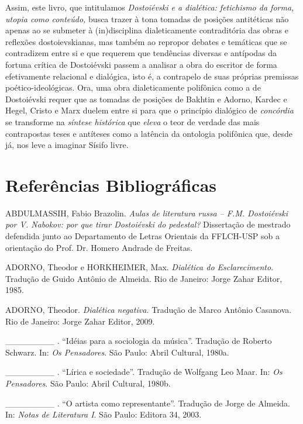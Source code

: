 Assim, este livro, que intitulamos \emph{Dostoiévski e a dialética:
fetichismo da forma, utopia como conteúdo,} busca trazer à tona tomadas
de posições antitéticas não apenas ao se submeter à (in)disciplina
dialeticamente contraditória das obras e reflexões dostoievskianas, mas
também ao repropor debates e temáticas que se contradizem entre si e que
requerem que tendências diversas e antípodas da fortuna crítica de
Dostoiévski passem a analisar a obra do escritor de forma efetivamente
relacional e dialógica, isto é, a contrapelo de suas próprias premissas
poético-ideológicas. Ora, uma obra dialeticamente polifônica como a de
Dostoiévski requer que as tomadas de posições de Bakhtin e Adorno,
Kardec e Hegel, Cristo e Marx duelem entre si para que o princípio
dialógico de \emph{concórdia} se transforme na \emph{síntese histórica}
que \emph{eleva} o teor de verdade das mais contrapostas teses e
antíteses como a latência da ontologia polifônica que, desde já, nos
leve a imaginar Sísifo livre.

\chapter*{Referências Bibliográficas}


ABDULMASSIH, Fabio Brazolin. \emph{Aulas de literatura russa -- F.M.
Dostoiévski por V. Nabokov: por que tirar Dostoiévski do pedestal?}
Dissertação de mestrado defendida junto ao Departamento de Letras
Orientais da FFLCH-USP sob a orientação do Prof. Dr. Homero Andrade de
Freitas.

ADORNO, Theodor e HORKHEIMER, Max. \emph{Dialética do Esclarecimento}.
Tradução de Guido Antônio de Almeida. Rio de Janeiro: Jorge Zahar
Editor, 1985.

ADORNO, Theodor. \emph{Dialética negativa.} Tradução de Marco Antônio
Casanova. Rio de Janeiro: Jorge Zahar Editor, 2009.

\_\_\_\_\_\_\_\_ . ``Idéias para a sociologia da música''. Tradução de
Roberto Schwarz. In: \emph{Os Pensadores}. São Paulo: Abril Cultural,
1980a.

\_\_\_\_\_\_\_\_ . ``Lírica e sociedade''. Tradução de Wolfgang Leo
Maar. In: \emph{Os Pensadores}. São Paulo: Abril Cultural, 1980b.

\_\_\_\_\_\_\_\_ . ``O artista como representante''. Tradução de Jorge
de Almeida. In: \emph{Notas de Literatura I}. São Paulo: Editora 34,
2003.

